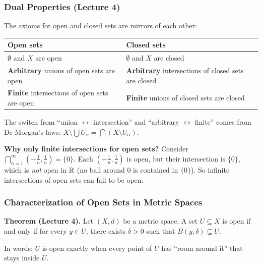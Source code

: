 \documentclass[../master/master.tex]{subfiles}
\begin{document}
\subsubsection*{Dual Properties (Lecture 4)}

The axioms for open and closed sets are mirrors of each other:

\begin{center}
\renewcommand{\arraystretch}{1.4}
\begin{tabular}{|l|l|}
\hline
\textbf{Open sets} & \textbf{Closed sets} \\
\hline
$\emptyset$ and $X$ are open & $\emptyset$ and $X$ are closed \\
\textbf{Arbitrary} unions of open sets are open & \textbf{Arbitrary} intersections of closed sets are closed \\
\textbf{Finite} intersections of open sets are open & \textbf{Finite} unions of closed sets are closed \\
\hline
\end{tabular}
\end{center}

The switch from ``union $\leftrightarrow$ intersection'' and ``arbitrary $\leftrightarrow$ finite'' comes from De Morgan's laws: $X \setminus \bigcup U_\alpha = \bigcap (X \setminus U_\alpha)$.

\begin{notebox}
\textbf{Why only finite intersections for open sets?} Consider $\bigcap_{n=1}^{\infty} (-\frac{1}{n}, \frac{1}{n}) = \{0\}$. Each $(-\frac{1}{n}, \frac{1}{n})$ is open, but their intersection is $\{0\}$, which is \emph{not} open in $\mathbb{R}$ (no ball around $0$ is contained in $\{0\}$). So infinite intersections of open sets can fail to be open.
\end{notebox}

\subsubsection*{Characterization of Open Sets in Metric Spaces}

\textbf{Theorem (Lecture 4).} Let $(X, d)$ be a metric space. A set $U \subseteq X$ is open if and only if for every $y \in U$, there exists $\delta > 0$ such that $B(y, \delta) \subseteq U$.

In words: $U$ is open exactly when every point of $U$ has ``room around it'' that stays inside $U$.
\end{document}
